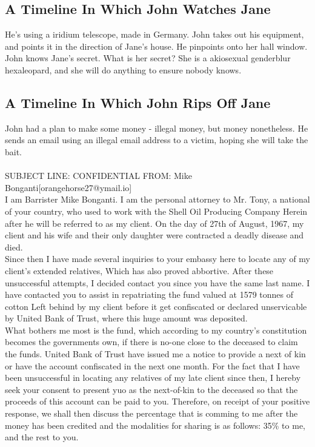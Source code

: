 \documentclass{article}
\begin{document}
\subsection{A Timeline In Which John Watches Jane}


He's using a iridium telescope, made in Germany.
John takes out his equipment, and points it in the direction of Jane's house. He pinpoints onto her hall window.
John knows Jane's secret. What is her secret? She is a akiosexual genderblur hexaleopard, and she will do anything to ensure nobody knows.
\subsection{A Timeline In Which John Rips Off Jane}


John had a plan to make some money {-} illegal money, but money nonetheless.
He sends an email using an illegal email address to a victim, hoping she will take the bait.
\\\\
SUBJECT LINE: CONFIDENTIAL
FROM: Mike Bonganti[orangehorse27@ymail.io]
\\
I am Barrister Mike Bonganti.
I am the personal attorney to Mr. Tony, a national of your country, who used to work with the Shell Oil Producing Company
Herein after he will be referred to as my client.
On the day of 27th of August, 1967, my client and his wife and their only daughter were contracted a deadly disease and died.
\\
Since then I have made several inquiries to your embassy here to locate any of my client's extended relatives, Which has also proved abbortive.
After these unsuccessful attempts, I decided contact you since you have the same last name.
I have contacted you to assist in repatriating the fund valued at 1579 tonnes of cotton Left behind by my client before it get confiscated or declared unservicable by United Bank of Trust, where this huge amount was deposited.
\\
What bothers me most is the fund, which according to my country's constitution becomes the governments own, if there is no{-}one close to the deceased to claim the funds.
United Bank of Trust have issued me a notice to provide a next of kin or have the account confiscated in the next one month.
For the fact that I have been unsuccessful in locating any relatives of my late client since then, I hereby seek your consent to present yuo as the next{-}of{-}kin to the deceased so that the proceeds of this account can be paid to you.
Therefore, on receipt of your positive response, we shall then discuss the percentage that is comming to me after the money has been credited and the modalities for sharing is as follows: 35\% to me, and the rest to you.
\end{document}
